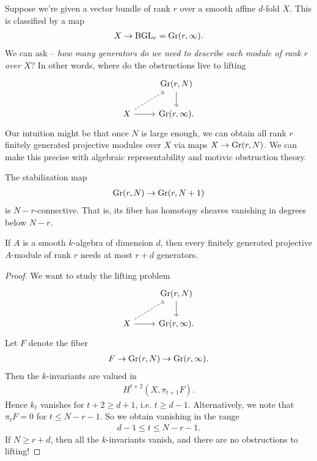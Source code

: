 \documentclass[11pt,openany]{book}
\begin{document}
Suppose we're given a vector bundle of rank $r$ over a smooth affine $d$-fold $X$. This is classified by a map
\begin{align*}
    X \to \mathrm{BGL}_r = \mathrm{Gr}(r,\infty).
\end{align*}
%
We can ask -- \textit{how many generators do we need to describe each module of rank $r$ over $X$}? In other words, where do the obstructions live to lifting
\[ \begin{tikzcd}
     & {\Gr(r,N)}\dar\\
    X\rar\ar[ur,dashed] & {\Gr(r,\infty)}.
\end{tikzcd} \]
%
Our intuition might be that once $N$ is large enough, we can obtain all rank $r$ finitely generated projective modules over $X$ via maps $X \to \mathrm{Gr}(r,N)$. We can make this precise with algebraic representability and motivic obstruction theory.

\begin{proposition} The stabilization map
\begin{align*}
    \mathrm{Gr}(r,N) \to \mathrm{Gr}(r,N+1)
\end{align*}
is $N-r$-connective. That is, its fiber has homotopy sheaves vanishing in degrees below $N-r$.
\end{proposition}

\begin{theorem} If $A$ is a smooth $k$-algebra of dimension $d$, then every finitely generated projective $A$-module of rank $r$ needs at most $r+d$ generators.
\end{theorem}
\begin{proof} We want to study the lifting problem
\[ \begin{tikzcd}
     & {\Gr(r,N)}\dar\\
    X\rar\ar[ur,dashed] & {\Gr(r,\infty).}
\end{tikzcd} \]
Let $F$ denote the fiber
\begin{align*}
    F \to \mathrm{Gr}(r,N) \to \mathrm{Gr}(r,\infty).
\end{align*}
Then the $k$-invariants are valued in
\begin{align*}
    H^{t+2}(X, \pi_{t+1}F).
\end{align*}
Hence $k_t$ vanishes for $t+2 \ge d+1$, i.e. $t\ge d-1$. Alternatively, we note that $\pi_t F = 0$ for $t \le N-r-1$. So we obtain vanishing in the range
\begin{align*}
    d-1 \le t \le N-r-1.
\end{align*}
If $N \ge r+d$, then all the $k$-invariants vanish, and there are no obstructions to lifting!
\end{proof}
\end{document}
